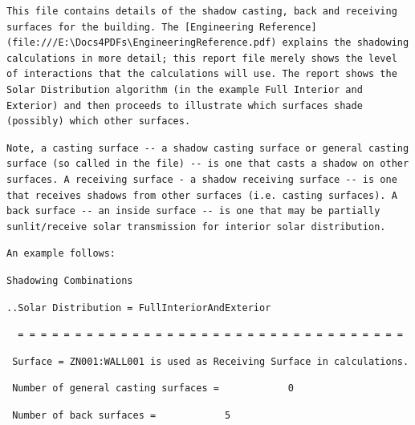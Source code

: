 \begin{lstlisting}
This file contains details of the shadow casting, back and receiving surfaces for the building. The [Engineering Reference](file:///E:\Docs4PDFs\EngineeringReference.pdf) explains the shadowing calculations in more detail; this report file merely shows the level of interactions that the calculations will use. The report shows the Solar Distribution algorithm (in the example Full Interior and Exterior) and then proceeds to illustrate which surfaces shade (possibly) which other surfaces.
\end{lstlisting}

\begin{lstlisting}
Note, a casting surface -- a shadow casting surface or general casting surface (so called in the file) -- is one that casts a shadow on other surfaces. A receiving surface - a shadow receiving surface -- is one that receives shadows from other surfaces (i.e. casting surfaces). A back surface -- an inside surface -- is one that may be partially sunlit/receive solar transmission for interior solar distribution.
\end{lstlisting}

\begin{lstlisting}
An example follows:
\end{lstlisting}

\begin{lstlisting}
Shadowing Combinations
\end{lstlisting}

\begin{lstlisting}
..Solar Distribution = FullInteriorAndExterior
\end{lstlisting}

\begin{lstlisting}
  = = = = = = = = = = = = = = = = = = = = = = = = = = = = = = = = = =
\end{lstlisting}

\begin{lstlisting}
 Surface = ZN001:WALL001 is used as Receiving Surface in calculations.
\end{lstlisting}

\begin{lstlisting}
 Number of general casting surfaces =            0
\end{lstlisting}

\begin{lstlisting}
 Number of back surfaces =            5
\end{lstlisting}

